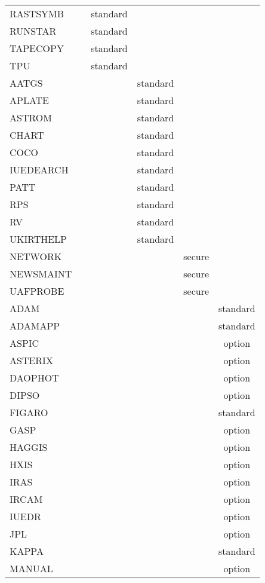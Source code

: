 {\begin{table}
\begin{center}
\begin{tabular}{||l||c|c|c||c||c||}
RASTSYMB  &   & standard &   &   &   \\
RUNSTAR   &   & standard &   &   &   \\
TAPECOPY  &   & standard &   &   &   \\
TPU       &   & standard &   &   &   \\
\hline
AATGS     &   &   & standard &   &   \\
APLATE    &   &   & standard &   &   \\
ASTROM    &   &   & standard &   &   \\
CHART     &   &   & standard &   &   \\
COCO      &   &   & standard &   &   \\
IUEDEARCH &   &   & standard &   &   \\
PATT      &   &   & standard &   &   \\
RPS       &   &   & standard &   &   \\
RV        &   &   & standard &   &   \\
UKIRTHELP &   &   & standard &   &   \\
\hline
\hline
NETWORK   &   &   &   & secure   &   \\
NEWSMAINT &   &   &   & secure   &   \\
UAFPROBE  &   &   &   & secure   &   \\
\hline
\hline
ADAM      &   &   &   &   & standard \\
ADAMAPP   &   &   &   &   & standard \\
ASPIC     &   &   &   &   & option   \\
ASTERIX   &   &   &   &   & option   \\
DAOPHOT   &   &   &   &   & option   \\
DIPSO     &   &   &   &   & option   \\
FIGARO    &   &   &   &   & standard \\
GASP      &   &   &   &   & option   \\
HAGGIS    &   &   &   &   & option   \\
HXIS      &   &   &   &   & option   \\
IRAS      &   &   &   &   & option   \\
IRCAM     &   &   &   &   & option   \\
IUEDR     &   &   &   &   & option   \\
JPL       &   &   &   &   & option   \\
KAPPA     &   &   &   &   & standard \\
MANUAL    &   &   &   &   & option   \\

\end{tabular}
\end{center}
\end{table}}

